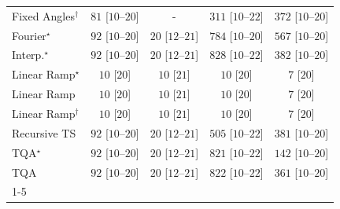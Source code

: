 \begin{tabular}{l|cccc|}
Fixed Angles$^\dagger$ & {\cellcolor[HTML]{EAF7E6}} \color[HTML]{000000} $81$ [$10$--$20$] & {\cellcolor[HTML]{000000}} \color[HTML]{F1F1F1} {\cellcolor{white}} \color{black} - & {\cellcolor[HTML]{A3DA9D}} \color[HTML]{000000} $311$ [$10$--$22$] & {\cellcolor[HTML]{88CE87}} \color[HTML]{000000} $372$ [$10$--$20$] \\
Fourier$^\star$ & {\cellcolor[HTML]{E8F6E4}} \color[HTML]{000000} $92$ [$10$--$20$] & {\cellcolor[HTML]{F5FBF2}} \color[HTML]{000000} $20$ [$12$--$21$] & {\cellcolor[HTML]{005522}} \color[HTML]{F1F1F1} $784$ [$10$--$20$] & {\cellcolor[HTML]{339C52}} \color[HTML]{F1F1F1} $567$ [$10$--$20$] \\
Interp.$^\star$ & {\cellcolor[HTML]{E8F6E4}} \color[HTML]{000000} $92$ [$10$--$20$] & {\cellcolor[HTML]{F5FBF2}} \color[HTML]{000000} $20$ [$12$--$21$] & {\cellcolor[HTML]{00441B}} \color[HTML]{F1F1F1} $828$ [$10$--$22$] & {\cellcolor[HTML]{84CC83}} \color[HTML]{000000} $382$ [$10$--$20$] \\
Linear Ramp$^\star$ & {\cellcolor[HTML]{F7FCF5}} \color[HTML]{000000} $10$ [$20$] & {\cellcolor[HTML]{F7FCF5}} \color[HTML]{000000} $10$ [$21$] & {\cellcolor[HTML]{F7FCF5}} \color[HTML]{000000} $10$ [$20$] & {\cellcolor[HTML]{F7FCF5}} \color[HTML]{000000} $7$ [$20$] \\
Linear Ramp & {\cellcolor[HTML]{F7FCF5}} \color[HTML]{000000} $10$ [$20$] & {\cellcolor[HTML]{F7FCF5}} \color[HTML]{000000} $10$ [$21$] & {\cellcolor[HTML]{F7FCF5}} \color[HTML]{000000} $10$ [$20$] & {\cellcolor[HTML]{F7FCF5}} \color[HTML]{000000} $7$ [$20$] \\
Linear Ramp$^\dagger$ & {\cellcolor[HTML]{F7FCF5}} \color[HTML]{000000} $10$ [$20$] & {\cellcolor[HTML]{F7FCF5}} \color[HTML]{000000} $10$ [$21$] & {\cellcolor[HTML]{F7FCF5}} \color[HTML]{000000} $10$ [$20$] & {\cellcolor[HTML]{F7FCF5}} \color[HTML]{000000} $7$ [$20$] \\
Recursive TS & {\cellcolor[HTML]{E8F6E4}} \color[HTML]{000000} $92$ [$10$--$20$] & {\cellcolor[HTML]{F5FBF2}} \color[HTML]{000000} $20$ [$12$--$21$] & {\cellcolor[HTML]{48AE60}} \color[HTML]{F1F1F1} $505$ [$10$--$22$] & {\cellcolor[HTML]{84CC83}} \color[HTML]{000000} $381$ [$10$--$20$] \\
TQA$^\star$ & {\cellcolor[HTML]{E8F6E4}} \color[HTML]{000000} $92$ [$10$--$20$] & {\cellcolor[HTML]{F5FBF2}} \color[HTML]{000000} $20$ [$12$--$21$] & {\cellcolor[HTML]{00471C}} \color[HTML]{F1F1F1} $821$ [$10$--$22$] & {\cellcolor[HTML]{DBF1D6}} \color[HTML]{000000} $142$ [$10$--$20$] \\
TQA & {\cellcolor[HTML]{E8F6E4}} \color[HTML]{000000} $92$ [$10$--$20$] & {\cellcolor[HTML]{F5FBF2}} \color[HTML]{000000} $20$ [$12$--$21$] & {\cellcolor[HTML]{00451C}} \color[HTML]{F1F1F1} $822$ [$10$--$22$] & {\cellcolor[HTML]{8DD08A}} \color[HTML]{000000} $361$ [$10$--$20$] \\
\cline{1-5}
\bottomrule
\end{tabular}
